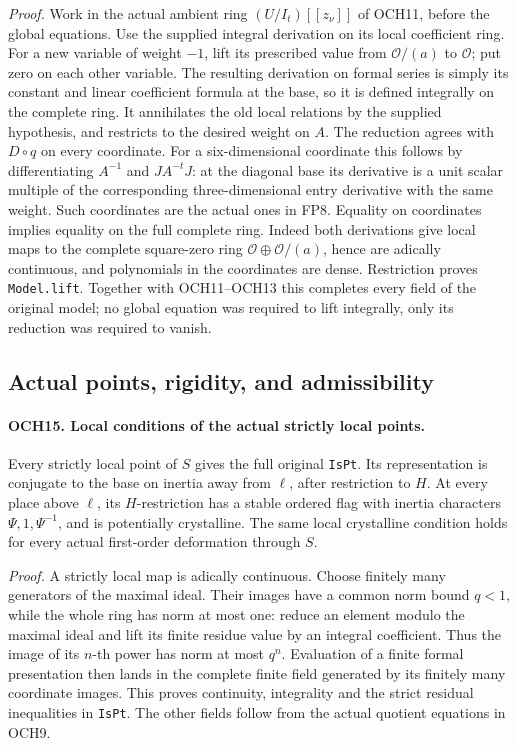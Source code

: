 \emph{Proof.}
Work in the actual ambient ring \((U/I_t)[[z_\nu]]\) of
OCH11, before the global equations.  Use the supplied integral
derivation on its local coefficient ring.  For a new variable of
weight \(-1\), lift its prescribed value from \(\mathcal O/(a)\)
to \(\mathcal O\); put zero on each other variable.
The resulting derivation on formal series is simply its constant
and linear coefficient formula at the base, so it is defined
integrally on the complete ring.  It annihilates the old local
relations by the supplied hypothesis, and restricts to the desired
weight on \(A\).
The reduction agrees with \(D\circ q\) on every coordinate.
For a six-dimensional coordinate this follows by differentiating
\(A^{-1}\) and \(JA^{-t}J\): at the diagonal base its derivative
is a unit scalar multiple of the corresponding three-dimensional
entry derivative with the same weight.  Such coordinates are the
actual ones in FP8.  Equality on coordinates implies equality on
the full complete ring.  Indeed both derivations give local maps
to the complete square-zero ring
\(\mathcal O\oplus\mathcal O/(a)\), hence are adically
continuous, and polynomials in the coordinates are dense.
Restriction proves \texttt{Model.lift}.  Together with
OCH11--OCH13 this completes every field of the original model;
no global equation was required to lift integrally, only its
reduction was required to vanish.

\subsection{Actual points, rigidity, and admissibility}

\paragraph{OCH15. Local conditions of the actual strictly local points.}
\label{claim:OCH15}
Every strictly local point of \(S\) gives the full original
\texttt{IsPt}.  Its representation is conjugate to the base on
inertia away from \(\ell\), after restriction to \(H\).
At every place above \(\ell\), its \(H\)-restriction has a
stable ordered flag with inertia characters
\(\Psi,1,\Psi^{-1}\), and is potentially crystalline.
The same local crystalline condition holds for every actual
first-order deformation through \(S\).

\emph{Proof.}
A strictly local map is adically continuous.  Choose finitely many
generators of the maximal ideal.  Their images have a common norm
bound \(q<1\), while the whole ring has norm at most one:
reduce an element modulo the maximal ideal and lift its finite
residue value by an integral coefficient.  Thus the image of its
\(n\)-th power has norm at most \(q^n\).
Evaluation of a finite formal presentation then lands in the
complete finite field generated by its finitely many coordinate
images.  This proves continuity, integrality and the strict
residual inequalities in \texttt{IsPt}.  The other fields follow
from the actual quotient equations in OCH9.

